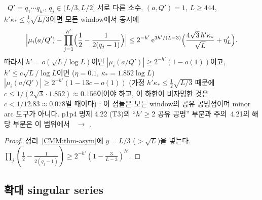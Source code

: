 \begin{corollary}[p1p4 명제 4.22 (T3)의 격상]\label{CMM:cor-T3}
\PROVED\ $Q'=q_1\cdots q_{h'}$, $q_j\in(L/3,L/2]$ 서로 다른 소수, $(a,Q')=1$, $L\ge444$, $h'\kappa_*\le\frac12\sqrt{L/3}$이면 모든 window에서 동시에
\[
\Bigl|\mu_i(a/Q')-\prod_{j=1}^{h'}\Bigl(\frac12-\frac1{2(q_j-1)}\Bigr)\Bigr|\le2^{-h'}\,\mathrm{e}^{3h'/(L-3)}\Bigl(\frac{4\sqrt3\,h'\kappa_*}{\sqrt L}+\eta'_L\Bigr).
\]
따라서 $h'=o(\sqrt L/\log L)$이면 $|\mu_i(a/Q')|\ge2^{-h'}(1-o(1))$이고, $h'\le c\sqrt L/\log L$이면 ($\eta=0.1$, $\kappa_*=1.852\log L$)
$|\mu_i(a/Q')|\ge2^{-h'}(1-13c-o(1))$
(가정 $h'\kappa_*\le\frac12\sqrt{L/3}$ 때문에 $c\le1/(2\sqrt3\cdot1.852)\approx0.156$이어야 하고, 이 하한이 비자명한 것은 $c<1/12.83\approx0.078$일 때이다)
: 이 점들은 모든 window의 공유 공명점이며
minor arc 도구가 아니다. p1p4 명제 4.22 (T3)의 ``$h'\ge2$ 공유 공명'' 부분과 주의~4.21의 해당 부분은 이 범위에서 \HEUR\ $\to$ \PROVED.
\end{corollary}
\begin{proof}
정리~\ref{CMM:thm-asym}에 $y=L/3$ ($>\sqrt L$)을 넣는다. $\prod_j(\frac12-\frac1{2(q_j-1)})\ge2^{-h'}(1-\frac{3}{L-3})^{h'}$.
\end{proof}

\subsection{확대 singular series}\label{CMM:ssec-SS}

